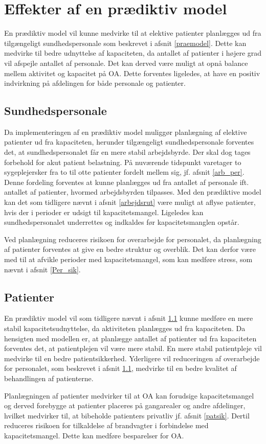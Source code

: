 \section{Effekter af en prædiktiv model}
En prædiktiv model vil kunne medvirke til at elektive patienter planlægges ud fra tilgængeligt sundhedspersonale som beskrevet i afsnit \ref{praemodel}. Dette kan medvirke til bedre udnyttelse af kapaciteten, da antallet af patienter i højere grad vil afspejle antallet af personale. Det kan derved være muligt at opnå balance mellem aktivitet og kapacitet på OA. Dette forventes ligeledes, at have en positiv indvirkning på afdelingen for både personale og patienter. 


\subsection{Sundhedspersonale} \label{sundper}
Da implementeringen af en prædiktiv model muliggør planlægning af elektive patienter ud fra kapaciteten, herunder tilgængeligt sundhedspersonale forventes det, at sundhedspersonalet får en mere stabil arbejdsbyrde. Der skal dog tages forbehold for akut patient belastning. På nuværende tidspunkt varetager to sygeplejersker fra to til otte patienter fordelt mellem sig, jf. afsnit \ref{arb_per}. Denne fordeling forventes at kunne planlægges ud fra antallet af personale ift. antallet af patienter, hvormed arbejdsbyrden tilpasses.  Med den prædiktive model kan det som tidligere nævnt i afsnit \ref{arbejdsrut} være muligt at aflyse patienter, hvis der i perioder er udsigt til kapacitetsmangel. Ligeledes kan sundhedspersonalet underrettes og indkaldes før kapacitetsmanglen opstår.


Ved planlægning reduceres risikoen for overarbejde for personalet, da planlægning af patienter forventes at give en bedre struktur og overblik. Det kan derfor være med til at afvikle perioder med kapacitetsmangel, som kan medføre stress, som nævnt i afsnit \ref{Per_sik}.


\subsection{Patienter}
En prædiktiv model vil som tidligere nævnt i afsnit \ref{sundper} kunne medføre en mere stabil kapacitetsudnyttelse, da aktiviteten planlægges ud fra kapaciteten. Da hensigten med modellen er, at planlægge antallet af patienter ud fra kapaciteten forventes det, at patientplejen vil være mere stabil. En mere stabil patientpleje vil medvirke til en bedre patientsikkerhed. Yderligere vil reduceringen af overarbejde for personalet, som beskrevet i afsnit \ref{sundper}, medvirke til en bedre kvalitet af behandlingen af patienterne. 


Planlægningen af patienter medvirker til at OA kan forudsige kapacitetsmangel og derved forebygge at patienter placeres på gangarealer og andre afdelinger, hvilket medvirker til, at bibeholde patienters privatliv jf. afsnit \ref{patsik}. Dertil reduceres risikoen for tilkaldelse af brandvagter i forbindelse med kapacitetsmangel. Dette kan medføre besparelser for OA. 
